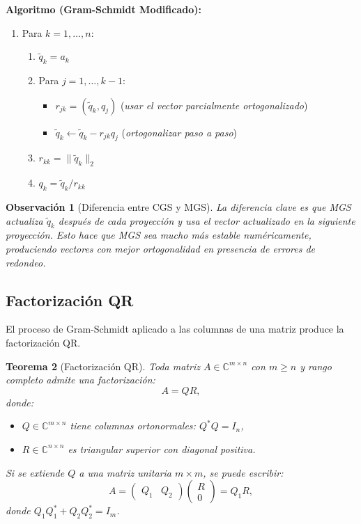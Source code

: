 \documentclass[a4paper,11pt]{report}
\newtheorem{theorem}{Teorema}[chapter]
\newtheorem{remark}[theorem]{Observación}
\begin{document}
\textbf{Algoritmo (Gram-Schmidt Modificado):}
\begin{enumerate}
\item Para $k = 1, \ldots, n$:
   \begin{enumerate}
   \item $\tilde{q}_k = a_k$
   \item Para $j = 1, \ldots, k-1$:
      \begin{itemize}
      \item $r_{jk} = (\tilde{q}_k, q_j)$ \quad (\emph{usar el vector parcialmente ortogonalizado})
      \item $\tilde{q}_k \leftarrow \tilde{q}_k - r_{jk} q_j$ \quad (\emph{ortogonalizar paso a paso})
      \end{itemize}
   \item $r_{kk} = \|\tilde{q}_k\|_2$
   \item $q_k = \tilde{q}_k / r_{kk}$
   \end{enumerate}
\end{enumerate}

\begin{remark}[Diferencia entre CGS y MGS]
La diferencia clave es que MGS actualiza $\tilde{q}_k$ después de cada proyección y usa el vector actualizado en la siguiente proyección. Esto hace que MGS sea mucho más estable numéricamente, produciendo vectores con mejor ortogonalidad en presencia de errores de redondeo.
\end{remark}

\subsection{Factorización QR}

El proceso de Gram-Schmidt aplicado a las columnas de una matriz produce la factorización QR.

\begin{theorem}[Factorización QR]
Toda matriz $A \in \mathbb{C}^{m \times n}$ con $m \geq n$ y rango completo admite una factorización:
\[
A = QR,
\]
donde:
\begin{itemize}
\item $Q \in \mathbb{C}^{m \times n}$ tiene columnas ortonormales: $Q^*Q = I_n$,
\item $R \in \mathbb{C}^{n \times n}$ es triangular superior con diagonal positiva.
\end{itemize}

Si se extiende $Q$ a una matriz unitaria $m \times m$, se puede escribir:
\[
A = \begin{pmatrix} Q_1 & Q_2 \end{pmatrix} \begin{pmatrix} R \\ 0 \end{pmatrix} = Q_1 R,
\]
donde $Q_1 Q_1^* + Q_2 Q_2^* = I_m$.
\end{theorem}
\end{document}
